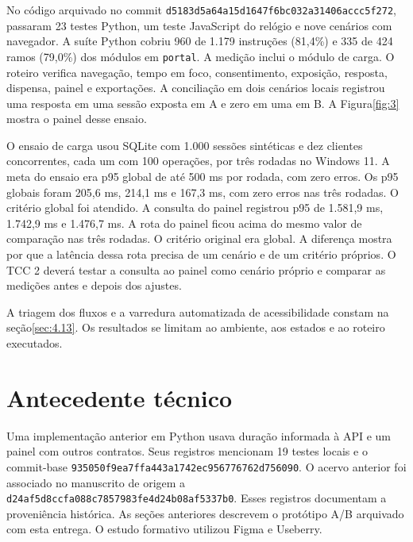 No código arquivado no commit \texttt{d5183d5a64a1\allowbreak{}5d1647f6bc03\allowbreak{}2a31406accc5\allowbreak{}f272}, passaram 23 testes Python, um teste JavaScript do relógio e nove cenários com navegador. A suíte Python cobriu 960 de 1.179 instruções (81,4\%) e 335 de 424 ramos (79,0\%) dos módulos em \texttt{portal}. A medição inclui o módulo de carga. O roteiro verifica navegação, tempo em foco, consentimento, exposição, resposta, dispensa, painel e exportações. A conciliação em dois cenários locais registrou uma resposta em uma sessão exposta em A e zero em uma em B. A Figura\nobreakspace{}\ref{fig:3} mostra o painel desse ensaio.

O ensaio de carga usou SQLite com 1.000 sessões sintéticas e dez clientes concorrentes, cada um com 100 operações, por três rodadas no Windows 11. A meta do ensaio era p95 global de até 500 ms por rodada, com zero erros. Os p95 globais foram 205,6 ms, 214,1 ms e 167,3 ms, com zero erros nas três rodadas. O critério global foi atendido. A consulta do painel registrou p95 de 1.581,9 ms, 1.742,9 ms e 1.476,7 ms. A rota do painel ficou acima do mesmo valor de comparação nas três rodadas. O critério original era global. A diferença mostra por que a latência dessa rota precisa de um cenário e de um critério próprios. O TCC 2 deverá testar a consulta ao painel como cenário próprio e comparar as medições antes e depois dos ajustes.

A triagem dos fluxos e a varredura automatizada de acessibilidade constam na seção\nobreakspace{}\ref{sec:4.13}. Os resultados se limitam ao ambiente, aos estados e ao roteiro executados.

\section{Antecedente técnico}
\label{sec:4.20}

Uma implementação anterior em Python usava duração informada à API e um painel com outros contratos. Seus registros mencionam 19 testes locais e o commit-base \texttt{935050f9ea7f\allowbreak{}fa443a1742ec\allowbreak{}956776762d75\allowbreak{}6090}. O acervo anterior foi associado no manuscrito de origem a \texttt{d24af5d8ccfa\allowbreak{}088c7857983f\allowbreak{}e4d24b08af53\allowbreak{}37b0}. Esses registros documentam a proveniência histórica. As seções anteriores descrevem o protótipo A/B arquivado com esta entrega. O estudo formativo utilizou Figma e Useberry.
